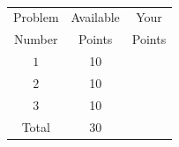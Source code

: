 \documentclass[]{exam}
\numberwithin{equation}{section}
\begin{document}
\clearpage
\normalsize
\
\vspace{.5cm}

\huge
\begin{center}
\begin{tabular}{|c|c|c|}
\hline
Problem  & Available  &   Your  \\
Number & Points &    Points  \\	\hline\hline

 $1$  & 10  &   \\	\hline
 $2$  & 10  &   \\	\hline
 $3$  & 10 &   \\	\hline

Total & 30  & \\ \hline
\end{tabular}
\end{center}

\pagebreak
\end{document}
